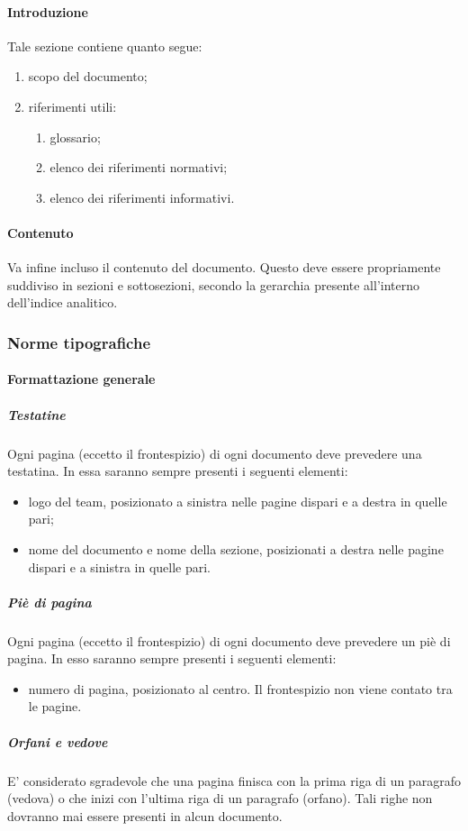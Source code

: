 			\paragraph{Introduzione}
				Tale sezione contiene quanto segue:
				\begin{enumerate}
					\item scopo del documento;
					\item riferimenti utili:
					\begin{enumerate}
						\item glossario;
						\item elenco dei riferimenti normativi;
						\item elenco dei riferimenti informativi.
					\end{enumerate}
				\end{enumerate}
			\paragraph{Contenuto}
				Va infine incluso il contenuto del documento. Questo deve essere propriamente suddiviso in sezioni e sottosezioni, secondo la gerarchia presente all’interno dell’indice analitico.
		\subsubsection{Norme tipografiche}
			\paragraph{Formattazione generale}
				\subparagraph{Testatine}
					Ogni pagina (eccetto il frontespizio) di ogni documento deve prevedere una testatina. In essa saranno sempre presenti i seguenti elementi:
					\begin{itemize}
						\item logo del team, posizionato a sinistra nelle pagine dispari e a destra in quelle pari;
						\item nome del documento e nome della sezione, posizionati a destra nelle pagine dispari e a sinistra in quelle pari.
					\end{itemize}
				\subparagraph{Piè di pagina}
					Ogni pagina (eccetto il frontespizio) di ogni documento deve prevedere un piè di pagina. In esso saranno sempre presenti i seguenti elementi:
					\begin{itemize}
						\item numero di pagina, posizionato al centro. Il frontespizio non viene contato tra le pagine.
					\end{itemize}
				\subparagraph{Orfani e vedove}
					E’ considerato sgradevole che una pagina finisca con la prima riga di un paragrafo (vedova) o che inizi con l’ultima riga di un paragrafo (orfano). Tali righe non dovranno mai essere presenti in alcun documento.
